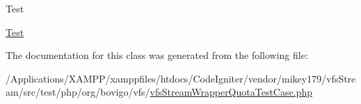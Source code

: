 \begin{DoxyRefDesc}{Test}
\item[\mbox{\hyperlink{test__test000233}{Test}}]\end{DoxyRefDesc}


The documentation for this class was generated from the following file\+:\begin{DoxyCompactItemize}
\item 
/\+Applications/\+X\+A\+M\+P\+P/xamppfiles/htdocs/\+Code\+Igniter/vendor/mikey179/vfs\+Stream/src/test/php/org/bovigo/vfs/\mbox{\hyperlink{vfs_stream_wrapper_quota_test_case_8php}{vfs\+Stream\+Wrapper\+Quota\+Test\+Case.\+php}}\end{DoxyCompactItemize}
